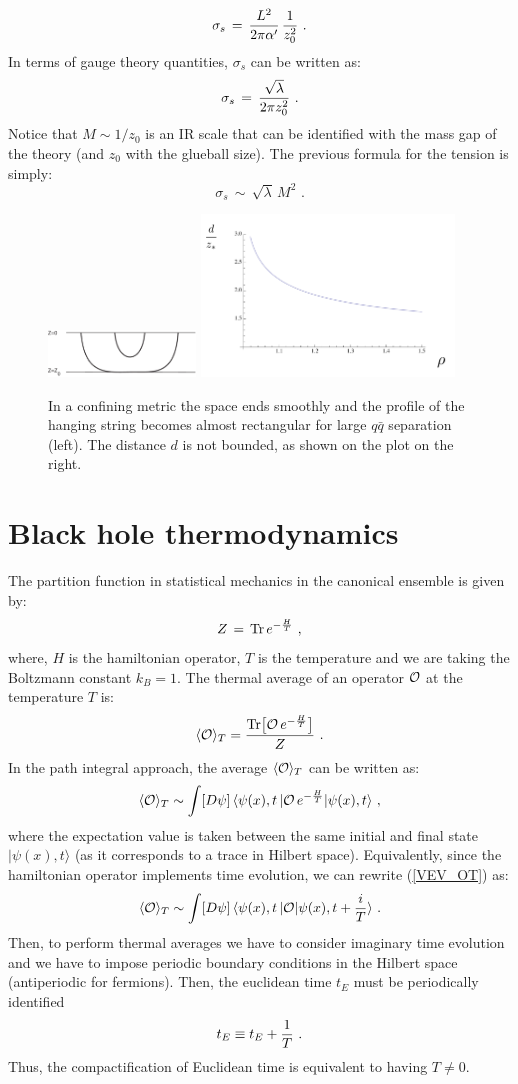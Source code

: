\documentclass[12pt,notitlepage,a4paper]{article}
\newcommand{\beq}{\begin{equation}}
\newcommand{\eeq}{\end{equation}}
\begin{document}
\beq
\sigma_s\,=\,
{L^2\over 2\pi\alpha'}\,{1\over z_0^2}\,\,.
\eeq
In terms of gauge theory quantities, $\sigma_s$ can be written as:
\beq
\sigma_s\,=\,{\sqrt{\lambda}\over 2\pi z_0^2}\,\,.
\eeq
Notice that $M\sim 1/ z_0$ is an IR scale that can be identified with  the mass gap of the theory (and $z_0$ with the glueball size). The previous formula for the tension is simply:
\beq
\sigma_s\,\sim\,\sqrt{\lambda}\,M^2\,\,.
\eeq
\begin{figure}[ht]
\center
\includegraphics[width=0.35\textwidth]{Wilsonconfining.pdf}
\includegraphics[width=0.60\textwidth]{dWL_confining.pdf}
\caption{In a confining metric the space ends smoothly and the profile of the hanging string becomes almost rectangular for large $q\bar q$ separation (left). The distance $d$  is not bounded, as shown on the plot on the right. } 
\label{Wilson_confining}
\end{figure}


\section{Black hole thermodynamics}

The partition function in statistical mechanics in the canonical ensemble is given by:
\beq
Z\,=\,{\rm Tr}\,e^{-{H\over T}}\,\,,
\eeq
where, $H$ is the hamiltonian operator,  $T$ is the temperature and we are taking the Boltzmann constant $k_B=1$.  The thermal average of an operator ${\cal O}$ at the temperature $T$ is:
\beq
\langle {\cal O}\rangle_{T}={{\rm Tr}\big[{\cal O}\,e^{-{H\over T}}\big]\over Z}\,\,.
\eeq
In the path integral approach, the average $\langle {\cal O}\rangle_{T}$ can be written as:
\beq
\langle {\cal O}\rangle_{T}\sim 
\int [D\psi] \,
\langle \psi(x), t\,| {\cal O}\,e^{-{H\over T}} |\psi(x), t\rangle\,\,,
\label{VEV_OT}
\eeq
where the expectation value is taken between the same initial and final state $ |\psi(x), t\rangle$ (as it corresponds to a trace in Hilbert space).  Equivalently, since the hamiltonian operator implements time evolution,  we can rewrite 
(\ref{VEV_OT}) as:
\beq
\langle {\cal O}\rangle_{T}\sim 
\int [D\psi] \,
\langle \psi(x), t\,| {\cal O} |\psi(x), t+{i\over T}\rangle\,\,.
\label{VEV_Thermal}
\eeq
Then, to perform thermal averages we have to consider imaginary time evolution and we have to impose periodic boundary conditions in the Hilbert space (antiperiodic for fermions). Then, the euclidean time $t_E$ must be periodically identified
\beq
t_E\equiv t_E+{1\over T}\,\,.
\eeq
Thus, the  compactification of Euclidean time is equivalent to having $T\not=0$. 
\end{document}
